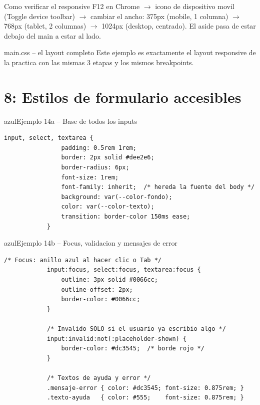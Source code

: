 \documentclass[11pt,a4paper]{article}
\begin{document}
	\begin{cajaresultado}{Como verificar el responsive}
		F12 en Chrome $\to$ icono de dispositivo movil (Toggle device toolbar) $\to$ cambiar el ancho: 375px (mobile, 1 columna) $\to$ 768px (tablet, 2 columnas) $\to$ 1024px (desktop, centrado). El aside pasa de estar debajo del main a estar al lado.
	\end{cajaresultado}
	
	\begin{cajapractica}{main.css -- el layout completo}
		Este ejemplo es exactamente el layout responsive de la practica con las mismas 3 etapas y los mismos breakpoints.
	\end{cajapractica}
	
	\section{8: Estilos de formulario accesibles}
	
	\begin{cajacodigo}{azul}{Ejemplo 14a -- Base de todos los inputs}
		\begin{lstlisting}[style=codecss]
			input, select, textarea {
				padding: 0.5rem 1rem;
				border: 2px solid #dee2e6;
				border-radius: 6px;
				font-size: 1rem;
				font-family: inherit;  /* hereda la fuente del body */
				background: var(--color-fondo);
				color: var(--color-texto);
				transition: border-color 150ms ease;
			}
		\end{lstlisting}
	\end{cajacodigo}
	
	\begin{cajacodigo}{azul}{Ejemplo 14b -- Focus, validacion y mensajes de error}
		\begin{lstlisting}[style=codecss]
			/* Focus: anillo azul al hacer clic o Tab */
			input:focus, select:focus, textarea:focus {
				outline: 3px solid #0066cc;
				outline-offset: 2px;
				border-color: #0066cc;
			}
			
			/* Invalido SOLO si el usuario ya escribio algo */
			input:invalid:not(:placeholder-shown) {
				border-color: #dc3545;  /* borde rojo */
			}
			
			/* Textos de ayuda y error */
			.mensaje-error { color: #dc3545; font-size: 0.875rem; }
			.texto-ayuda   { color: #555;    font-size: 0.875rem; }
		\end{lstlisting}
	\end{cajacodigo}
	
\end{document}

